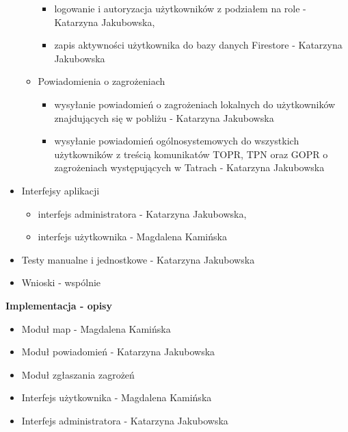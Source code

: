 \begin{itemize}
\begin{itemize}[label=$\circ$]
\begin{itemize}
                \item logowanie i autoryzacja użytkowników z podziałem na role - Katarzyna Jakubowska,
                \item zapis aktywności użytkownika do bazy danych Firestore - Katarzyna Jakubowska
            \end{itemize}
            \item Powiadomienia o zagrożeniach
            \begin{itemize}
                \item wysyłanie powiadomień o zagrożeniach lokalnych do użytkowników znajdujących się w pobliżu - Katarzyna Jakubowska
                \item wysyłanie powiadomień ogólnosystemowych do wszystkich użytkowników z treścią komunikatów TOPR, TPN oraz GOPR o zagrożeniach występujących w Tatrach - Katarzyna Jakubowska
            \end{itemize}
        \end{itemize}
        \item Interfejsy aplikacji
        \begin{itemize}[label=$\circ$]
            \item interfejs administratora - Katarzyna Jakubowska,
            \item interfejs użytkownika - Magdalena Kamińska
        \end{itemize}
        \item Testy manualne i jednostkowe - Katarzyna Jakubowska
        \item Wnioski - wspólnie
        \end{itemize}

    \textbf{Implementacja - opisy}
    \begin{itemize}
        \item Moduł map - Magdalena Kamińska
        \item Moduł powiadomień - Katarzyna Jakubowska
        \item Moduł zgłaszania zagrożeń 
        \item Interfejs użytkownika - Magdalena Kamińska
        \item Interfejs administratora - Katarzyna Jakubowska
    \end{itemize}

    \newpage